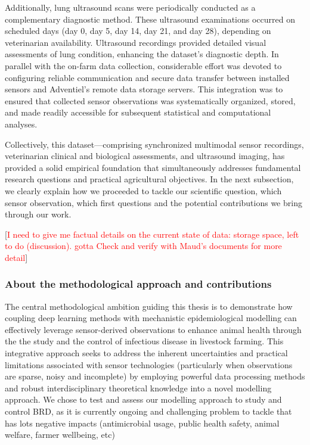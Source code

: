 Additionally, lung ultrasound scans were periodically conducted as a complementary diagnostic method. These ultrasound examinations occurred on scheduled days (day 0, day 5, day 14, day 21, and day 28), depending on veterinarian availability. Ultrasound recordings provided detailed visual assessments of lung condition, enhancing the dataset’s diagnostic depth. In parallel with the on-farm data collection, considerable effort was devoted to configuring reliable communication and secure data transfer between installed sensors and Adventiel's remote data storage servers. This integration was to ensured that collected sensor observations was systematically organized, stored, and made readily accessible for subsequent statistical and computational analyses.

Collectively, this dataset—comprising synchronized multimodal sensor recordings, veterinarian clinical and biological assessments, and ultrasound imaging, has provided a solid empirical foundation that simultaneously addresses fundamental research questions and practical agricultural objectives. In the next subsection, we clearly explain how we proceeded to tackle our scientific question, which sensor observation, which first questions and the potential contributions we bring through our work.

[\textcolor{red}{I need to give me factual details on the current state of data: storage space, left to do (discussion). gotta Check and verify with Maud's documents for more detail}]
 

\subsubsection{About the methodological approach and contributions}

The central methodological ambition guiding this thesis is to demonstrate how coupling deep learning methods with mechanistic epidemiological modelling can effectively leverage sensor-derived observations to enhance animal health through the the study and the control of infectious disease in livestock farming. This integrative approach seeks to address the inherent uncertainties and practical limitations associated with sensor technologies (particularly when observations are sparse, noisy and incomplete) by employing powerful data processing methods and robust interdisciplinary theoretical knowledge into a novel modelling approach. We chose to test and assess our modelling approach to study and control BRD, as it is currently ongoing and challenging problem to tackle that has lots negative impacts (antimicrobial usage, public health safety, animal welfare, farmer wellbeing, etc)

